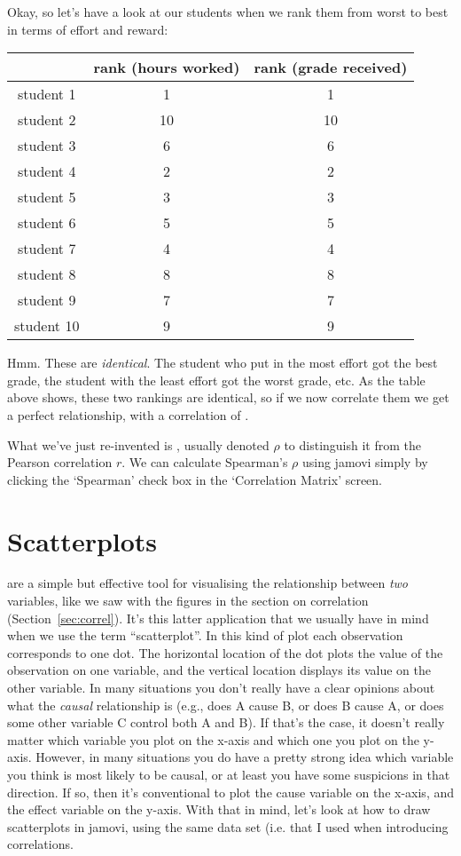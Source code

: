 Okay, so let's have a look at our students when we rank them from worst to best in terms of effort and reward: 
\begin{center}
\begin{tabular}{c|cc}
& rank (hours worked) & rank (grade received) \\ \hline
student    1 &   1 &   1 \\
student  2  & 10   &10 \\
student   3 &   6  &  6 \\
student    4 &   2 &   2 \\
student    5 &   3 &   3 \\
student   6  &  5  &  5 \\
student   7  &  4  &  4 \\
student   8  &  8  &  8 \\
student  9   & 7  &  7 \\
student   10  &  9&    9
\end{tabular}
\end{center}
Hmm. These are {\it identical}. The student who put in the most effort got the best grade, the student with the least effort got the worst grade, etc. As the table above shows, these two rankings are identical, so if we now correlate them we get a perfect relationship, with a correlation of .

What we've just re-invented is , usually denoted $\rho$ to distinguish it from the Pearson correlation $r$. We can calculate Spearman's $\rho$ using jamovi simply by clicking the `Spearman' check box in the `Correlation Matrix' screen. 


\section{Scatterplots\label{sec:scatterplots}}

 are a simple but effective tool for visualising the relationship between {\it two} variables, like we saw with the figures in the section on correlation (Section~\ref{sec:correl}). It's this latter application that we usually have in mind when we use the term ``scatterplot''. In this kind of plot each observation corresponds to one dot. The horizontal location of the dot plots the value of the observation on one variable, and the vertical location displays its value on the other variable. In many situations you don't really have a clear opinions about what the {\it causal} relationship is (e.g., does A cause B, or does B cause A, or does some other variable C control both A and B). If that's the case, it doesn't really matter which variable you plot on the x-axis and which one you plot on the y-axis. However, in many situations you do have a pretty strong idea which variable you think is most likely to be causal, or at least you have some suspicions in that direction. If so, then it's conventional to plot the cause variable on the x-axis, and the effect variable on the y-axis. With that in mind, let's look at how to draw scatterplots in jamovi, using the same  data set (i.e.  that I used when introducing correlations.

